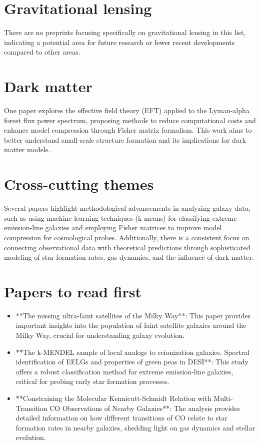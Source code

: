 \documentclass[11pt]{article}
\begin{document}
\section*{Gravitational lensing}
There are no preprints focusing specifically on gravitational lensing in this list, indicating a potential area for future research or fewer recent developments compared to other areas.
\section*{Dark matter}
One paper explores the effective field theory (EFT) applied to the Lyman-alpha forest flux power spectrum, proposing methods to reduce computational costs and enhance model compression through Fisher matrix formalism. This work aims to better understand small-scale structure formation and its implications for dark matter models.
\section*{Cross-cutting themes}
Several papers highlight methodological advancements in analyzing galaxy data, such as using machine learning techniques (k-means) for classifying extreme emission-line galaxies and employing Fisher matrices to improve model compression for cosmological probes. Additionally, there is a consistent focus on connecting observational data with theoretical predictions through sophisticated modeling of star formation rates, gas dynamics, and the influence of dark matter.
\section*{Papers to read first}
\begin{itemize}
\item **The missing ultra-faint satellites of the Milky Way**: This paper provides important insights into the population of faint satellite galaxies around the Milky Way, crucial for understanding galaxy evolution.
\end{itemize}
\begin{itemize}
\item **The k-MENDEL sample of local analogs to reionization galaxies. Spectral identification of EELGs and properties of green peas in DESI**: This study offers a robust classification method for extreme emission-line galaxies, critical for probing early star formation processes.
\end{itemize}
\begin{itemize}
\item **Constraining the Molecular Kennicutt-Schmidt Relation with Multi-Transition CO Observations of Nearby Galaxies**: The analysis provides detailed information on how different transitions of CO relate to star formation rates in nearby galaxies, shedding light on gas dynamics and stellar evolution.
\end{itemize}
\end{document}
